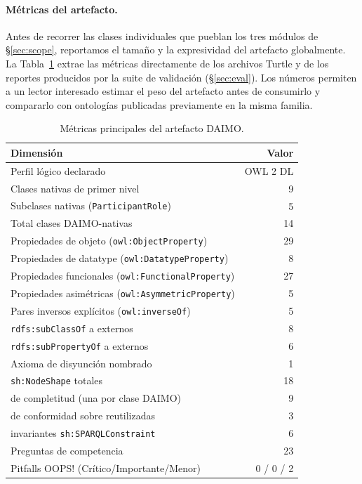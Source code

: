 \documentclass[Afour,sagev,times]{sagej}
\newcommand{\code}[1]{\texttt{#1}}
\begin{document}
\paragraph{Métricas del artefacto.}\label{sec:metrics}

Antes de recorrer las clases individuales que pueblan los tres módulos de §\ref{sec:scope}, reportamos el tamaño y la expresividad del artefacto globalmente. La Tabla~\ref{tab:metrics} extrae las métricas directamente de los archivos Turtle y de los reportes producidos por la suite de validación (§\ref{sec:eval}). Los números permiten a un lector interesado estimar el peso del artefacto antes de consumirlo y compararlo con ontologías publicadas previamente en la misma familia.

\begin{table}[tb]
\small\sf\centering
\caption{Métricas principales del artefacto DAIMO.\label{tab:metrics}}
\begin{tabular}{@{}p{4.6cm}r@{}}
\toprule
\textbf{Dimensión} & \textbf{Valor} \\
\midrule
Perfil lógico declarado & OWL 2 DL \\
Clases nativas de primer nivel & 9 \\
Subclases nativas (\code{ParticipantRole}) & 5 \\
Total clases DAIMO-nativas & 14 \\
Propiedades de objeto (\code{owl:ObjectProperty}) & 29 \\
Propiedades de datatype (\code{owl:DatatypeProperty}) & 8 \\
Propiedades funcionales (\code{owl:FunctionalProperty}) & 27 \\
Propiedades asimétricas (\code{owl:AsymmetricProperty}) & 5 \\
Pares inversos explícitos (\code{owl:inverseOf}) & 5 \\
\code{rdfs:subClassOf} a externos & 8 \\
\code{rdfs:subPropertyOf} a externos & 6 \\
Axioma de disyunción nombrado & 1 \\
\code{sh:NodeShape} totales & 18 \\
\quad de completitud (una por clase DAIMO) & 9 \\
\quad de conformidad sobre reutilizadas & 3 \\
\quad invariantes \code{sh:SPARQLConstraint} & 6 \\
Preguntas de competencia & 23 \\
Pitfalls OOPS! (Crítico/Importante/Menor) & 0 / 0 / 2 \\
\bottomrule
\end{tabular}
\end{table}
\end{document}
